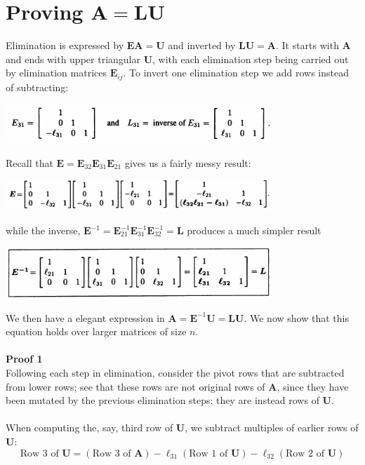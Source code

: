 \documentclass{report}
\begin{document}
\section{Proving $\bm A=\bm{LU}$}
Elimination is expressed by $\bm{EA}=\bm U$ and inverted by $\bm{LU}=\bm A$. It starts with $\bm A$ and ends with upper triangular $\bm U$, with each elimination step
being carried out by elimination matrices $\bm E_{ij}$. To invert one elimination step we add rows instead of subtracting:
\begin{center}
\includegraphics[width=10cm]{8}
\end{center}
Recall that $\bm E=\bm E_{32}\bm E_{31}\bm E_{21}$ gives us a fairly messy result:
\begin{center}
\includegraphics[width=10cm]{5}
\end{center}
while the inverse, $\bm E^{-1}=\bm E_{21}^{-1}\bm E_{31}^{-1}\bm E_{32}^{-1}=\bm L$ produces a much simpler result
\begin{center}
\includegraphics[width=10cm]{6}
\end{center}
We then have a elegant expression in $\bm A=\bm E^{-1}\bm U=\bm{LU}$. We now show that this equation holds over larger matrices of size $n$.\\
\vspace{1mm}\\
\textbf{Proof 1}\\
Following each step in elimination, consider the pivot rows that are subtracted from lower rows; see that these rows are not original rows of $\bm A$, since
they have been mutated by the previous elimination steps; they are instead rows of $\bm U$.\\
\vspace{1mm}\\
When computing the, say, third row of $\bm U$, we subtract multiples of earlier rows of $\bm U$:
\begin{equation*}
\text{Row 3 of $\bm U$}=(\text{Row 3 of $\bm A$})-\ell_{31}(\text{Row 1 of $\bm U$})-\ell_{32}(\text{Row 2 of $\bm U$})
\end{equation*}
\end{document}
